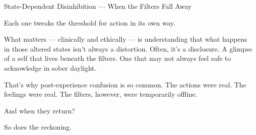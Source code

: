 \begin{TechnicalSidebar}{State-Dependent Disinhibition — When the Filters Fall Away}
  \medskip

  Each one tweaks the threshold for action in its own way.

  \medskip

  What matters --- clinically and ethically --- is understanding that what happens in those altered 
  states isn’t always a distortion. Often, it’s a disclosure. A glimpse of a self that lives beneath 
  the filters. One that may not always feel safe to acknowledge in sober daylight.

  \medskip

  That’s why post-experience confusion is so common. The actions were real. The feelings were real.  
  The filters, however, were temporarily offline.

  \medskip

  And when they return?

  \medskip

  So does the reckoning.

\end{TechnicalSidebar}

